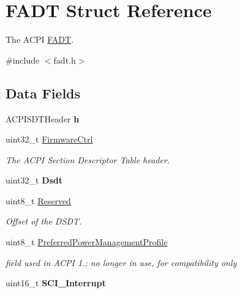 \hypertarget{structFADT}{}\section{F\+A\+DT Struct Reference}
\label{structFADT}


The A\+C\+PI \hyperlink{structFADT}{F\+A\+DT}.  




{\ttfamily \#include $<$fadt.\+h$>$}

\subsection*{Data Fields}
\begin{DoxyCompactItemize}
\item 
A\+C\+P\+I\+S\+D\+T\+Header {\bfseries h}\hypertarget{structFADT_a6370fbfdcb782629fd1f9243d386abf5}{}\label{structFADT_a6370fbfdcb782629fd1f9243d386abf5}

\item 
uint32\+\_\+t \hyperlink{structFADT_a34a5b74e45c28d23db2f1399cb0fed72}{Firmware\+Ctrl}\hypertarget{structFADT_a34a5b74e45c28d23db2f1399cb0fed72}{}\label{structFADT_a34a5b74e45c28d23db2f1399cb0fed72}

\begin{DoxyCompactList}\small\item\em The A\+C\+PI Section Descriptor Table header. \end{DoxyCompactList}\item 
uint32\+\_\+t {\bfseries Dsdt}\hypertarget{structFADT_a0edfead5a199a7b48a87898f26d35ff4}{}\label{structFADT_a0edfead5a199a7b48a87898f26d35ff4}

\item 
uint8\+\_\+t \hyperlink{structFADT_afbba574a9f42ad8a2df7b2b9f320e169}{Reserved}\hypertarget{structFADT_afbba574a9f42ad8a2df7b2b9f320e169}{}\label{structFADT_afbba574a9f42ad8a2df7b2b9f320e169}

\begin{DoxyCompactList}\small\item\em Offset of the D\+S\+DT. \end{DoxyCompactList}\item 
uint8\+\_\+t \hyperlink{structFADT_a0c1c87c1a02fc29df6d8cb41ccc4391f}{Preferred\+Power\+Management\+Profile}\hypertarget{structFADT_a0c1c87c1a02fc29df6d8cb41ccc4391f}{}\label{structFADT_a0c1c87c1a02fc29df6d8cb41ccc4391f}

\begin{DoxyCompactList}\small\item\em field used in A\+C\+PI 1.; no longer in use, for compatibility only \end{DoxyCompactList}\item 
uint16\+\_\+t {\bfseries S\+C\+I\+\_\+\+Interrupt}\hypertarget{structFADT_a6030c56b75a419de540eaf1ed6c4f38a}{}\label{structFADT_a6030c56b75a419de540eaf1ed6c4f38a}


\end{DoxyCompactItemize}
